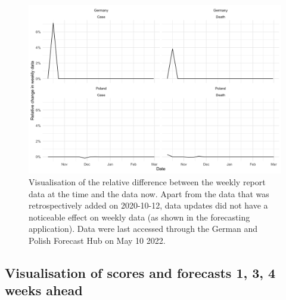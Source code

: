 \documentclass[10pt,letterpaper]{article}
\begin{document}
\begin{figure}[H]
\includegraphics[width=1\linewidth,]{../analysis/plots/weekly-data-updates} \caption{Visualisation of the relative difference between the weekly report data at the time and the data now. Apart from the data that was retrospectively added on 2020-10-12, data updates did not have a noticeable effect on weekly data (as shown in the forecasting application). Data were last accessed through the German and Polish Forecast Hub on May 10 2022.}\label{fig:weekly-truth-update}
\end{figure}

\clearpage

\hypertarget{visualisation-of-scores-and-forecasts-1-3-4-weeks-ahead}{%
\subsection{Visualisation of scores and forecasts 1, 3, 4 weeks
ahead}\label{visualisation-of-scores-and-forecasts-1-3-4-weeks-ahead}}
\end{document}
